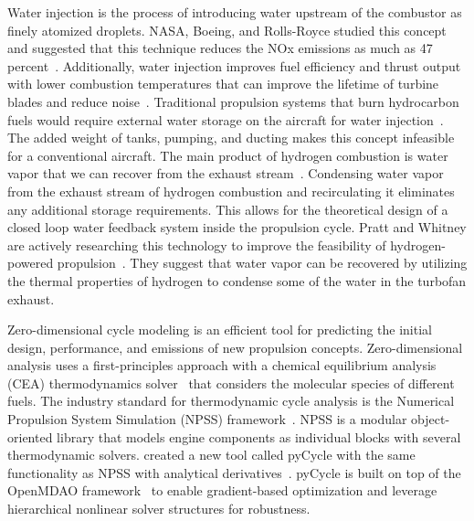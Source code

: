 \documentclass[conf]{new-aiaa}
\begin{document}
Water injection is the process of introducing water upstream of the combustor as finely atomized droplets.
NASA, Boeing, and Rolls-Royce studied this concept and suggested that this technique reduces the NOx emissions as much as 47 percent~\cite{Daggett2010}.
Additionally, water injection improves fuel efficiency and thrust output with lower combustion temperatures that can improve the lifetime of turbine blades and reduce noise~\cite{Daggett2010}.
Traditional propulsion systems that burn hydrocarbon fuels would require external water storage on the aircraft for water injection~\cite{Mourouzidis2015}.
The added weight of tanks, pumping, and ducting makes this concept infeasible for a conventional aircraft.
The main product of hydrogen combustion is water vapor that we can recover from the exhaust stream~\cite{Strom2002}.
Condensing water vapor from the exhaust stream of hydrogen combustion and recirculating it eliminates any additional storage requirements.
This allows for the theoretical design of a closed loop water feedback system inside the propulsion cycle.
Pratt and Whitney are actively researching this technology to improve the feasibility of hydrogen-powered propulsion~\cite{arpa-e_2021}.
They suggest that water vapor can be recovered by utilizing the thermal properties of hydrogen to condense some of the water in the turbofan exhaust.

Zero-dimensional cycle modeling is an efficient tool for predicting the initial design, performance, and emissions of new propulsion concepts.
Zero-dimensional analysis uses a first-principles approach with a chemical equilibrium analysis (CEA) thermodynamics solver~\cite{Gordon1994} that considers the molecular species of different fuels.
The industry standard for thermodynamic cycle analysis is the Numerical Propulsion System Simulation (NPSS) framework~\cite{JonesNPSS}.
NPSS is a modular object-oriented library that models engine components as individual blocks with several thermodynamic solvers.
\citet{Hendricks2019} created a new tool called pyCycle with the same functionality as NPSS with analytical derivatives~\cite{Gray2017b}.
pyCycle is built on top of the OpenMDAO framework~\cite{Gray2019a} to enable gradient-based optimization and leverage hierarchical nonlinear solver structures for robustness.
\end{document}
